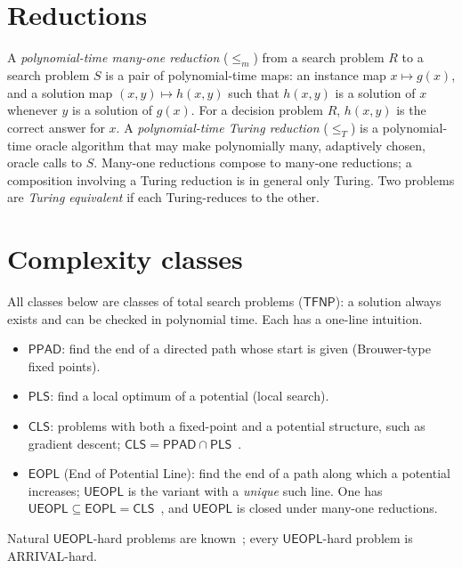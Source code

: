 \section{Reductions}\label{sec:pre-red}

A \emph{polynomial-time many-one reduction} ($\le_m$) from a search problem $R$ to a search problem $S$
is a pair of polynomial-time maps: an instance map $x\mapsto g(x)$, and a solution map
$(x,y)\mapsto h(x,y)$ such that $h(x,y)$ is a solution of $x$ whenever $y$ is a solution of $g(x)$. For a
decision problem $R$, $h(x,y)$ is the correct answer for $x$. A \emph{polynomial-time Turing reduction}
($\le_T$) is a polynomial-time oracle algorithm that may make polynomially many, adaptively chosen,
oracle calls to $S$. Many-one reductions compose to many-one reductions; a composition involving a
Turing reduction is in general only Turing. Two problems are \emph{Turing equivalent} if each
Turing-reduces to the other.

\section{Complexity classes}\label{sec:pre-classes}

All classes below are classes of total search problems ($\mathsf{TFNP}$): a solution always exists and
can be checked in polynomial time. Each has a one-line intuition.
\begin{itemize}[nosep]
\item $\mathsf{PPAD}$: find the end of a directed path whose start is given (Brouwer-type fixed points).
\item $\mathsf{PLS}$: find a local optimum of a potential (local search).
\item $\mathsf{CLS}$: problems with both a fixed-point and a potential structure, such as gradient
descent; $\mathsf{CLS}=\mathsf{PPAD}\cap\mathsf{PLS}$~\cite{fghs23}.
\item $\mathsf{EOPL}$ (End of Potential Line): find the end of a path along which a potential
increases; $\mathsf{UEOPL}$ is the variant with a \emph{unique} such line. One has
$\mathsf{UEOPL}\subseteq\mathsf{EOPL}=\mathsf{CLS}$~\cite{fgms18,gjhmprt22,fghs23}, and $\mathsf{UEOPL}$ is closed
under many-one reductions.
\end{itemize}
Natural $\mathsf{UEOPL}$-hard problems are known~\cite{hmr26}; every $\mathsf{UEOPL}$-hard problem is
ARRIVAL-hard.

